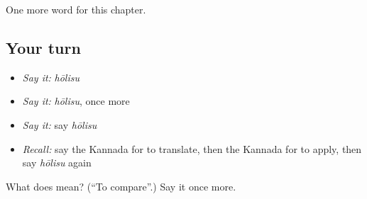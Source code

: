 \begin{grammarlens}[title={What you've built}]
One more word for this chapter.
\end{grammarlens}

\subsection*{Your turn}
\begin{itemize}
\raggedright
  \item \emph{Say it:} \emph{hōlisu}
  \item \emph{Say it:} \emph{hōlisu}, once more
  \item \emph{Say it:} say \emph{hōlisu}
  \item \emph{Recall:} say the Kannada for to translate, then the Kannada for to apply, then say \emph{hōlisu} again
\end{itemize}

\begin{tcolorbox}[breakable,colback=teal!4,colframe=teal!35!black,title={Before you move on}]
What does  mean? (\textquotedblleft{}To compare\textquotedblright{}.) Say it once more.
\end{tcolorbox}
